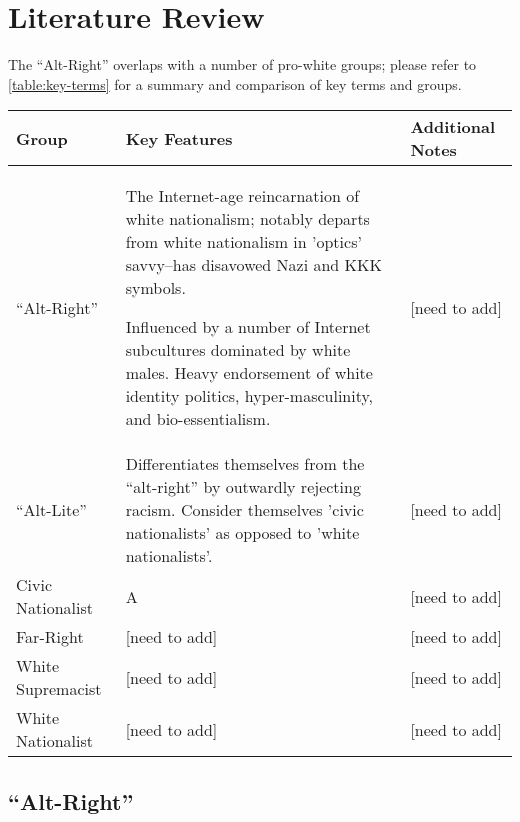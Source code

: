 \documentclass[acmlarge, screen, authorversion]{acmart}
\begin{document}
\section{Literature Review}

The ``Alt-Right'' overlaps with a number of pro-white groups; please refer to \ref{table:key-terms} for a summary and comparison of key terms and groups.

\begin{table*}

  \caption{Key Terms}
  \label{table:key-terms}
  
  \begin{tabular}{ p{2cm}  p{6cm}  p{4cm} }
  
    \toprule
     Group & Key Features &  Additional Notes\\ 
    \midrule
 ``Alt-Right'' & The Internet-age reincarnation of white nationalism; notably departs from white nationalism in 'optics' savvy--has disavowed Nazi and KKK symbols. 
 
 Influenced by a number of Internet subcultures dominated by white males. Heavy endorsement of white identity politics, hyper-masculinity, and bio-essentialism.  & [need to add] \\ 
 \hline
 ``Alt-Lite'' & Differentiates themselves from the ``alt-right'' by outwardly rejecting racism. Consider themselves 'civic nationalists' as opposed to 'white nationalists'. & [need to add]\\
  \hline
  Civic Nationalist & A & [need to add]\\
  \hline
 Far-Right & [need to add] & [need to add]\\
 \hline
 White Supremacist & [need to add] & [need to add]\\
  \hline
 White Nationalist & [need to add] & [need to add]\\
   \bottomrule
\end{tabular}
\end{table*}

\subsection{``Alt-Right''}
\end{document}
